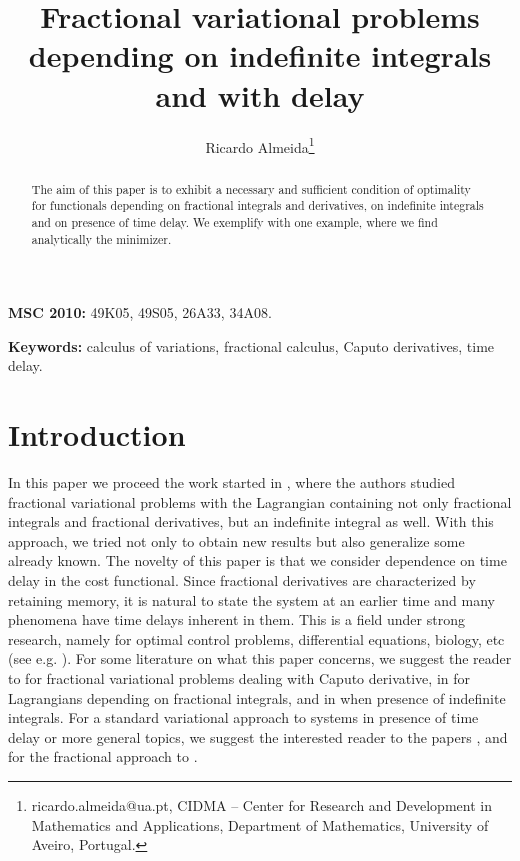 \documentclass[10pt]{article}
\newenvironment{keywords}{\begin{center}
\begin{minipage}[c]{13.4cm} {\bf Keywords:}} {\end{minipage}
\end{center}}
\newenvironment{msc}{\begin{center}
\begin{minipage}[c]{13.4cm} {\bf MSC 2010:}} {\end{minipage}
\end{center}}
\begin{document}
\title{Fractional variational problems\\
depending on indefinite integrals and with delay}

\author{Ricardo Almeida\footnote{ricardo.almeida@ua.pt, CIDMA -- Center for Research and Development in Mathematics and Applications,
Department of Mathematics, University of Aveiro, Portugal.}}

\date{}

\maketitle


\begin{abstract}
The aim of this paper is to exhibit a necessary and sufficient condition of optimality for functionals depending on fractional  integrals and derivatives, on indefinite integrals
and on presence of time delay. We exemplify with one example, where we find analytically the minimizer.
\end{abstract}

\begin{msc}
49K05, 49S05, 26A33, 34A08.
\end{msc}

\begin{keywords}
calculus of variations, fractional calculus, Caputo derivatives, time delay.
\end{keywords}


\section{Introduction}\label{sec:intro}
In this paper we proceed the work started in \cite{Almeida5}, where the authors studied fractional variational problems with the Lagrangian containing not only
 fractional integrals and fractional derivatives, but an indefinite integral as well. With this approach, we tried not only to obtain new results but also
 generalize some already known. The novelty of this paper is that we consider dependence on time delay in the cost functional. Since fractional derivatives are
 characterized by retaining memory, it is natural to state the system at an earlier time and many phenomena have time delays inherent in them. This is a field under
 strong research, namely for optimal control problems, differential equations, biology, etc (see e.g. \cite{Chen,Dehghan,Liu0,Liu,Mo,Udaltsov,Xu,Zhu}).
 For some literature on what this paper concerns, we suggest the reader to \cite{AGRA1,Almeida,Baleanu1,Bhrawy,Chen2,Gastao0,Loghmani,Malinowska,Mozyrska,Yueqiang} for fractional variational problems dealing with Caputo derivative, in \cite{Almeida1} for Lagrangians depending on fractional integrals, and in \cite{Gregory,Nat} when presence of indefinite integrals.
 For a standard variational approach to systems in presence of time delay or more general topics, we suggest the interested reader to the papers \cite{AGRA0,Rosenblueth1,Rosenblueth2,Wang}, and for the fractional
 approach to \cite{Baleanu,Jarad}.
\end{document}

